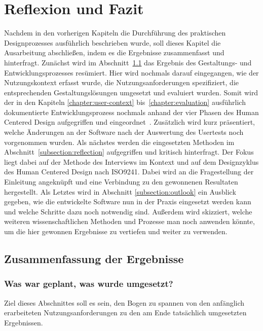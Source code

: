 \chapter{Reflexion und Fazit}
\label{chapter:conclusion}

Nachdem in den vorherigen Kapiteln die Durchführung des praktischen
Designprozesses ausführlich beschrieben wurde, soll dieses Kapitel die
Ausarbeitung abschließen, indem es die Ergebnisse zusammenfasst und
hinterfragt. Zunächst wird im Abschnitt~\ref{subsection:resultDescription} das
Ergebnis des Gestaltungs- und Entwicklungsprozesses resümiert. Hier wird
nochmals darauf eingegangen, wie der Nutzungskontext erfasst wurde, die
Nutzungsanforderungen spezifiziert, die entsprechenden Gestaltungslösungen
umgesetzt und evaluiert wurden. Somit wird der in den Kapiteln
\ref{chapter:user-context} bis~\ref{chapter:evaluation} ausführlich
dokumentierte Entwicklungsprozess nochmals anhand der vier Phasen des Human
Centered Design aufgegriffen und eingeordnet~\cite{ISO9241}. Zusätzlich wird
kurz präsentiert, welche Änderungen an der Software nach der Auswertung des
Usertests noch vorgenommen wurden. Als nächstes werden die eingesetzten
Methoden im Abschnitt~\ref{subsection:reflection} aufgegriffen und kritisch
hinterfragt. Der Fokus liegt dabei auf der Methode des Interviews im Kontext
und auf dem Designzyklus des Human Centered Design nach ISO9241. Dabei wird an
die Fragestellung der Einleitung angeknüpft und eine Verbindung zu den
gewonnenen Resultaten hergestellt. Als Letztes wird in Abschnitt
\ref{subsection:outlook} ein Ausblick gegeben, wie die entwickelte Software nun
in der Praxis eingesetzt werden kann und welche Schritte dazu noch notwendig
sind. Außerdem wird skizziert, welche weiteren wissenschaftlichen Methoden
und Prozesse man noch anwenden könnte, um die hier gewonnen Ergebnisse zu
vertiefen und weiter zu verwenden.

\section{Zusammenfassung der Ergebnisse}
\label{subsection:resultDescription}

\subsection*{Was war geplant, was wurde umgesetzt?}
Ziel dieses Abschnittes soll es sein, den Bogen zu spannen von den
anfänglich erarbeiteten Nutzungsanforderungen zu den am Ende tatsächlich
umgesetzten Ergebnissen.

